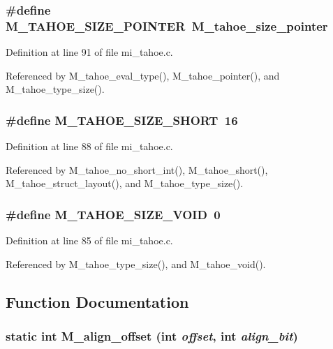 \subsubsection{\setlength{\rightskip}{0pt plus 5cm}\#define M\_\-TAHOE\_\-SIZE\_\-POINTER~\bf{M\_\-tahoe\_\-size\_\-pointer}}\label{mi__tahoe_8c_0e7cf21704aaa6e43f3cd82265e30e1a}




Definition at line 91 of file mi\_\-tahoe.c.

Referenced by M\_\-tahoe\_\-eval\_\-type(), M\_\-tahoe\_\-pointer(), and M\_\-tahoe\_\-type\_\-size().
\subsubsection{\setlength{\rightskip}{0pt plus 5cm}\#define M\_\-TAHOE\_\-SIZE\_\-SHORT~16}\label{mi__tahoe_8c_d81bfc821416ff2bd7ff65a9b36ec82a}




Definition at line 88 of file mi\_\-tahoe.c.

Referenced by M\_\-tahoe\_\-no\_\-short\_\-int(), M\_\-tahoe\_\-short(), M\_\-tahoe\_\-struct\_\-layout(), and M\_\-tahoe\_\-type\_\-size().
\subsubsection{\setlength{\rightskip}{0pt plus 5cm}\#define M\_\-TAHOE\_\-SIZE\_\-VOID~0}\label{mi__tahoe_8c_395a839784475e53da85ad9cd94e0390}




Definition at line 85 of file mi\_\-tahoe.c.

Referenced by M\_\-tahoe\_\-type\_\-size(), and M\_\-tahoe\_\-void().

\subsection{Function Documentation}
\subsubsection{\setlength{\rightskip}{0pt plus 5cm}static int M\_\-align\_\-offset (int {\em offset}, int {\em align\_\-bit})\hspace{0.3cm}{\tt  [static]}}\label{mi__tahoe_8c_ad6bf5b83fe0b3c9e4cda1c22a10ed61}




